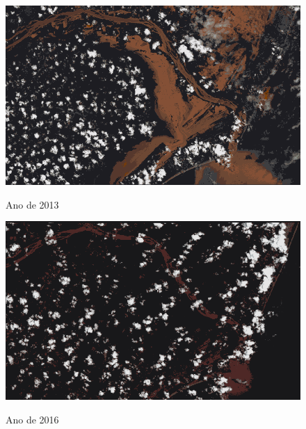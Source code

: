 			\begin{minipage}[t!]{0.33\textwidth}
				\begin{figure}[H]
					\centering \small \caption{Ano de 2013}
					\includegraphics[width=0.97\linewidth]{FIGURAS/20131226-compr}
					\label{fig:indao} 
				\end{figure}			
			\end{minipage}\hfill
			\begin{minipage}[t!]{0.33\textwidth}
				\begin{figure}[H]
					\centering \small \caption{Ano de 2016}
					\includegraphics[width=0.97\linewidth]{FIGURAS/20160202compre}
					\label{fig:indao2} 
				\end{figure}					
			\end{minipage} 
